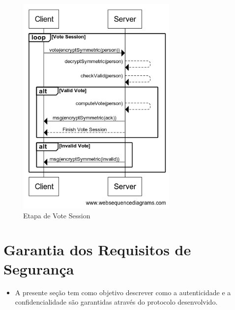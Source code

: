 \documentclass[10pt]{article}
\begin{document}
    \begin{figure}[ht]
    \centerline{\includegraphics[width=0.7\textwidth]{diagrama/voteSession.png}}
    \caption{Etapa de Vote Session}
    \label{fig:voteSession}
    \end{figure}
    
\section{Garantia dos Requisitos de Segurança}
    \begin{itemize}
    \item A presente seção tem como objetivo descrever como a autenticidade e a confidencialidade são garantidas através do protocolo desenvolvido.
    \end{itemize}
    
\end{document}

